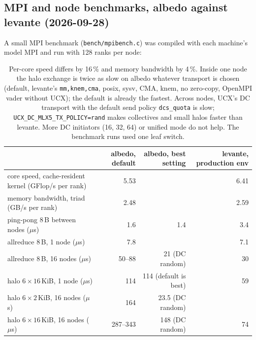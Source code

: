 \documentclass[11pt,a4paper]{article}
\begin{document}
\subsection{MPI and node benchmarks, albedo against levante (2026-09-28)}
A small MPI benchmark (\texttt{bench/mpibench.c}) was compiled with each machine's model MPI and run with 128 ranks per node:
\begin{table}[H]\centering\small
\begin{tabular}{lrrr}\toprule
 & albedo, default & albedo, best setting & levante, production env\\\midrule
core speed, cache-resident kernel (GFlop/s per rank) & 5.53 & & 6.41\\
memory bandwidth, triad (GB/s per rank) & 2.48 & & 2.59\\
ping-pong 8\,B between nodes ($\mu$s) & 1.6 & 1.4 & 3.4\\
allreduce 8\,B, 1 node ($\mu$s) & 7.8 & & 7.1\\
allreduce 8\,B, 16 nodes ($\mu$s) & 50--88 & 21 (DC random) & 30\\
halo $6\times16$\,KiB, 1 node ($\mu$s) & 114 & 114 (default is best) & 59\\
halo $6\times2$\,KiB, 16 nodes ($\mu$s) & 164 & 23.5 (DC random) & \\
halo $6\times16$\,KiB, 16 nodes ($\mu$s) & 287--343 & 148 (DC random) & 74\\\bottomrule
\end{tabular}
\caption{Per-core speed differs by 16\,\% and memory bandwidth by 4\,\%. Inside one node the halo exchange is twice as slow on albedo whatever transport is chosen (default, levante's \texttt{mm,knem,cma}, posix, sysv, CMA, knem, no zero-copy, OpenMPI vader without UCX); the default is already the fastest. Across nodes, UCX's DC transport with the default send policy \texttt{dcs\_quota} is slow; \texttt{UCX\_DC\_MLX5\_TX\_POLICY=rand} makes collectives and small halos faster than levante. More DC initiators (16, 32, 64) or unified mode do not help. The benchmark runs used one leaf switch.}
\end{table}
\end{document}
